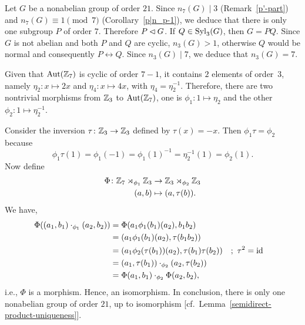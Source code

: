 \begin{xmpl}\label{example:group-of-order-21}
    Let $G$ be a nonabelian group of order $21$. Since $n_7(G)\mid3$ (Remark~\ref{p'-part}) and $n_7(G)\equiv 1\pmod 7$ (Corollary~\ref{p|n_p-1}), we deduce that there is only one subgroup $P$ of order $7$. Therefore $P\lhd G$. If $Q\in{\rm Syl}_3(G)$, then $G=PQ$. Since $G$ is not abelian and both $P$ and $Q$ are cyclic, $n_3(G)>1$, otherwise $Q$ would be normal and consequently $P\leftrightarrow Q$. Since $n_3(G)\mid 7$, we deduce that $n_3(G)=7$.

    Given that ${\rm Aut}(\mathbb{Z}_7)$ is cyclic of order $7-1$, it contains $2$ elements of order~$3$, namely $\eta_2\colon x\mapsto 2x$ and $\eta_4\colon x\mapsto4x$, with $\eta_4=\eta_2^{-1}$. Therefore, there are two nontrivial morphisms from $\mathbb{Z}_3$ to ${\rm Aut}(\mathbb{Z}_7)$, one is $\phi_1\colon1\mapsto\eta_2$ and the other $\phi_2\colon 1\mapsto\eta_2^{-1}$.

    Consider the inversion $\tau\colon\mathbb{Z}_3\to\mathbb{Z}_3$ defined by $\tau(x)=-x$. Then $\phi_1\tau=\phi_2$ because
    $$
        \phi_1\tau(1)=\phi_1(-1)=\phi_1(1)^{-1}=\eta_2^{-1}(1)=\phi_2(1).
    $$
    Now define
    \begin{align*}
        \Phi\colon\mathbb{Z}_7\rtimes_{\phi_1}\mathbb{Z}_3&\to\mathbb{Z}_3\rtimes_{\phi_2}\mathbb{Z}_3\\
            (a,b)&\mapsto(a,\tau(b)).
    \end{align*}
    We have,
    \begin{align*}
        \Phi((a_1,b_1)\cdot_{\phi_1}(a_2,b_2))
            &= \Phi(a_1\phi_1(b_1)(a_2),b_1b_2)\\
            &= (a_1\phi_1(b_1)(a_2),\tau(b_1b_2))\\
            &= (a_1\phi_2(\tau(b_1))(a_2),\tau(b_1)\tau(b_2))
                &&;\ \tau^2=\operatorname{id}\\
            &= (a_1,\tau(b_1))\cdot_{\phi_2}(a_2,\tau(b_2))\\
            &= \Phi(a_1,b_1)\cdot_{\phi_2}\Phi(a_2,b_2),
    \end{align*}
    i.e., $\Phi$ is a morphism. Hence, an isomorphism. In conclusion, there is only one nonabelian group of order $21$, up to isomorphism [cf.~Lemma~\ref{semidirect-product-uniqueness}].


\end{xmpl}
